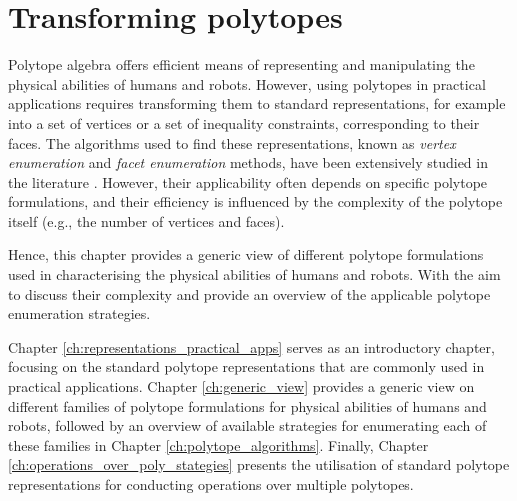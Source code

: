 

\chapter{Transforming polytopes}

Polytope algebra offers efficient means of representing and manipulating the physical abilities of humans and robots. However, using polytopes in practical applications requires transforming them to standard representations, for example into a set of vertices or a set of inequality constraints, corresponding to their faces. The algorithms used to find these representations, known as \textit{vertex enumeration} and \textit{facet enumeration} methods, have been extensively studied in the literature \cite{fukuda2004frequently}. However, their applicability often depends on specific polytope formulations, and their efficiency is influenced by the complexity of the polytope itself (e.g., the number of vertices and faces).

Hence, this chapter provides a generic view of different polytope formulations used in characterising the physical abilities of humans and robots. With the aim to discuss their complexity and provide an overview of the applicable polytope enumeration strategies.

Chapter \ref{ch:representations_practical_apps} serves as an introductory chapter, focusing on the standard polytope representations that are commonly used in practical applications. Chapter \ref{ch:generic_view} provides a generic view on different families of polytope formulations for physical abilities of humans and robots, followed by an overview of available strategies for enumerating each of these families in Chapter \ref{ch:polytope_algorithms}. Finally, Chapter \ref{ch:operations_over_poly_stategies} presents the utilisation of standard polytope representations for conducting operations over multiple polytopes.



